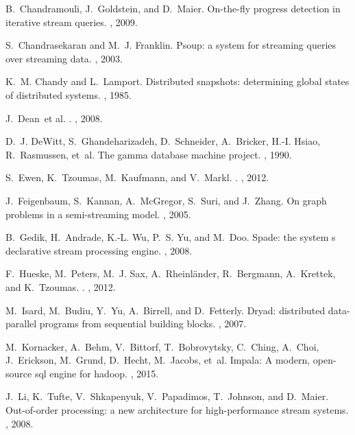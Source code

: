 \documentclass[11pt]{article}
\begin{document}
\begin{thebibliography}{10}
\begin{small}
B.~Chandramouli, J.~Goldstein, and D.~Maier.
\newblock On-the-fly progress detection in iterative stream queries.
, 2009.

S.~Chandrasekaran and M.~J. Franklin.
\newblock Psoup: a system for streaming queries over streaming data.
, 2003.

K.~M. Chandy and L.~Lamport.
\newblock Distributed snapshots: determining global states of distributed
  systems.
, 1985.

J.~Dean~et al.
.
, 2008.

D.~J. DeWitt, S.~Ghandeharizadeh, D.~Schneider, A.~Bricker, H.-I. Hsiao,
  R.~Rasmussen, et~al.
\newblock The gamma database machine project.
, 1990.

S.~Ewen, K.~Tzoumas, M.~Kaufmann, and V.~Markl.
.
, 2012.

J.~Feigenbaum, S.~Kannan, A.~McGregor, S.~Suri, and J.~Zhang.
\newblock On graph problems in a semi-streaming model.
, 2005.

B.~Gedik, H.~Andrade, K.-L. Wu, P.~S. Yu, and M.~Doo.
\newblock Spade: the system s declarative stream processing engine.
, 2008.

F.~Hueske, M.~Peters, M.~J. Sax, A.~Rheinl{\"a}nder, R.~Bergmann, A.~Krettek,
  and K.~Tzoumas.
.
, 2012.

M.~Isard, M.~Budiu, Y.~Yu, A.~Birrell, and D.~Fetterly.
\newblock Dryad: distributed data-parallel programs from sequential building
  blocks.
, 2007.

M.~Kornacker, A.~Behm, V.~Bittorf, T.~Bobrovytsky, C.~Ching, A.~Choi,
  J.~Erickson, M.~Grund, D.~Hecht, M.~Jacobs, et~al.
\newblock Impala: A modern, open-source sql engine for hadoop.
, 2015.

J.~Li, K.~Tufte, V.~Shkapenyuk, V.~Papadimos, T.~Johnson, and D.~Maier.
\newblock Out-of-order processing: a new architecture for high-performance
  stream systems.
, 2008.


\end{small}
\end{thebibliography}
\end{document}
